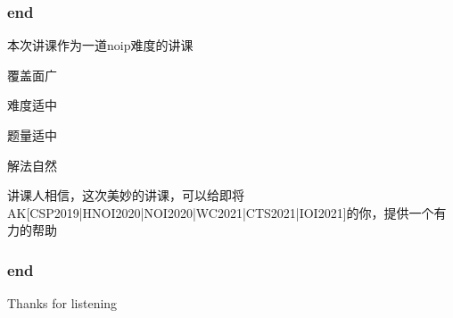 \documentclass[10pt]{beamer}
\begin{document}
	\clearpage
	\begin{frame}
		\frametitle{end}
		 本次讲课作为一道noip难度的讲课

		 覆盖面广

		 难度适中

		 题量适中

		 解法自然

		 讲课人相信，这次美妙的讲课，可以给即将AK[CSP2019|HNOI2020|NOI2020|WC2021|CTS2021|IOI2021]的你，提供一个有力的帮助
	\end{frame}
	\clearpage
	\begin{frame}
		\frametitle{end}
		\begin{center}
			\Huge Thanks for listening
		\end{center}
	\end{frame}
\end{document}
